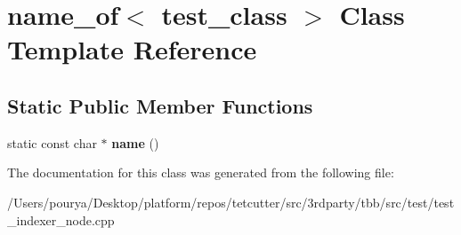 \hypertarget{classname__of_3_01test__class_01_4}{}\section{name\+\_\+of$<$ test\+\_\+class $>$ Class Template Reference}
\label{classname__of_3_01test__class_01_4}
\subsection*{Static Public Member Functions}
\begin{DoxyCompactItemize}
\item 
\hypertarget{classname__of_3_01test__class_01_4_a10494d13d20871dbb8d0f8b7a52ae7b2}{}static const char $\ast$ {\bfseries name} ()\label{classname__of_3_01test__class_01_4_a10494d13d20871dbb8d0f8b7a52ae7b2}

\end{DoxyCompactItemize}


The documentation for this class was generated from the following file\+:\begin{DoxyCompactItemize}
\item 
/\+Users/pourya/\+Desktop/platform/repos/tetcutter/src/3rdparty/tbb/src/test/test\+\_\+indexer\+\_\+node.\+cpp\end{DoxyCompactItemize}
